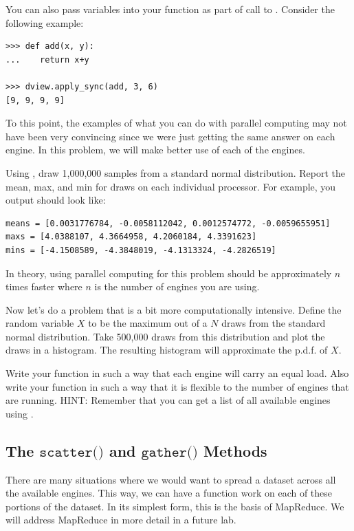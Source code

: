 You can also pass variables into your function as part of call to . Consider the following example:

\begin{lstlisting}
>>> def add(x, y):
...    return x+y

>>> dview.apply_sync(add, 3, 6)
[9, 9, 9, 9]
\end{lstlisting}

\begin{problem}
To this point, the examples of what you can do with parallel computing may not have been very convincing since we were just getting the same answer on each engine. In this problem, we will make better use of each of the engines.

Using , draw 1,000,000 samples from a standard normal distribution. Report the mean, max, and min for draws on each individual processor. For example, you output should look like:
\begin{lstlisting}
means = [0.0031776784, -0.0058112042, 0.0012574772, -0.0059655951]
maxs = [4.0388107, 4.3664958, 4.2060184, 4.3391623]
mins = [-4.1508589, -4.3848019, -4.1313324, -4.2826519]
\end{lstlisting}

In theory, using parallel computing for this problem should be approximately $n$ times faster where $n$ is the number of engines you are using.
\end{problem}

\begin{problem}
Now let's do a problem that is a bit more computationally intensive. Define the random variable $X$ to be the maximum out of a $N$ draws from the standard normal distribution. Take 500,000 draws from this distribution and plot the draws in a histogram. The resulting histogram will approximate the p.d.f. of $X$.

Write your function in such a way that each engine will carry an equal load. Also write your function in such a way that it is flexible to the number of engines that are running. HINT: Remember that you can get a list of all available engines using .
\end{problem}

\subsection*{The $\texttt{scatter()}$ and $\texttt{gather()}$ Methods}
There are many situations where we would want to spread a dataset across all the available engines. This way, we can have a function work on each of these portions of the dataset. In its simplest form, this is the basis of MapReduce. We will address MapReduce in more detail in a future lab.

